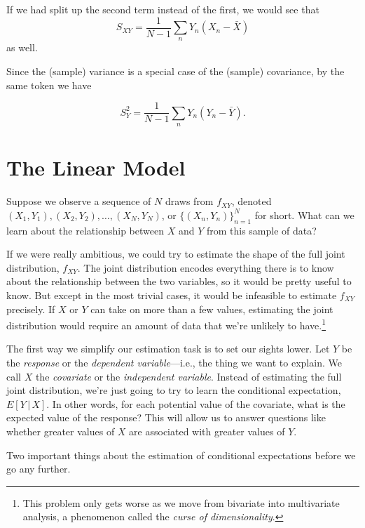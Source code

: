 \documentclass[12pt,oneside,openany]{book}
\let\rmarkdownfootnote\footnote%
\def\footnote{\protect\rmarkdownfootnote}
\begin{document}
If we had split up the second term instead of the first, we would see
that \[
S_{XY} = \frac{1}{N-1} \sum_n Y_n (X_n - \bar{X})
\] as well.

Since the (sample) variance is a special case of the (sample)
covariance, by the same token we have

\begin{equation}
S_Y^2 = \frac{1}{N-1} \sum_n Y_n (Y_n - \bar{Y}).
\end{equation}

\section{The Linear Model}\label{the-linear-model}

Suppose we observe a sequence of \(N\) draws from \(f_{XY}\), denoted
\((X_1, Y_1), (X_2, Y_2), \ldots, (X_N, Y_N)\), or
\(\{(X_n, Y_n)\}_{n=1}^N\) for short. What can we learn about the
relationship between \(X\) and \(Y\) from this sample of data?

If we were really ambitious, we could try to estimate the shape of the
full joint distribution, \(f_{XY}\). The joint distribution encodes
everything there is to know about the relationship between the two
variables, so it would be pretty useful to know. But except in the most
trivial cases, it would be infeasible to estimate \(f_{XY}\) precisely.
If \(X\) or \(Y\) can take on more than a few values, estimating the
joint distribution would require an amount of data that we're unlikely
to have.\footnote{This problem only gets worse as we move from bivariate
  into multivariate analysis, a phenomenon called the \emph{curse of
  dimensionality}.}

The first way we simplify our estimation task is to set our sights
lower. Let \(Y\) be the \emph{response} or the \emph{dependent
variable}---i.e., the thing we want to explain. We call \(X\) the
\emph{covariate} or the \emph{independent variable}. Instead of
estimating the full joint distribution, we're just going to try to learn
the conditional expectation, \(E[Y \,|\, X]\). In other words, for each
potential value of the covariate, what is the expected value of the
response? This will allow us to answer questions like whether greater
values of \(X\) are associated with greater values of \(Y\).

Two important things about the estimation of conditional expectations
before we go any further.
\end{document}
